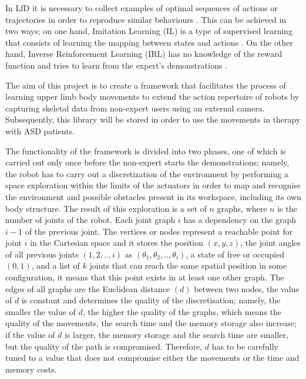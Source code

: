 \documentclass[thesis]{mas_proposal}
\begin{document}
    In LfD it is necessary to collect examples of optimal sequences of actions or trajectories in order to reproduce similar behaviours \cite{Piot2017}. This can be achieved in two ways; on one hand, Imitation Learning (IL) is a type of supervised learning that consists of learning the mapping between states and actions \cite{Dinyari2020}. On the other hand, Inverse Reinforcement Learning (IRL) has no knowledge of the reward function and tries to learn from the expert's demonstrations \cite{Reddy2019}.
    
    The aim of this project is to create a framework that facilitates the process of learning upper limb body movements to extend the action repertoire of robots by capturing skeletal data from non-expert users using an external camera. Subsequently, this library will be stored in order to use the movements in therapy with ASD patients.
    
    The functionality of the framework is divided into two phases, one of which is carried out only once before the non-expert starts the demonstrations; namely, the robot has to carry out a discretization of the environment by performing a space exploration within the limits of the actuators in order to map and recognise the environment and possible obstacles present in its workspace, including its own body structure. The result of this exploration is a set of $n$ graphs, where $n$ is the number of joints of the robot. Each joint graph $i$ has a dependency on the graph $i-1$ of the previous joint. The vertices or nodes represent a reachable point for joint $i$ in the Cartesian space and it stores the position $(x, y, z)$, the joint angles of all previous joints $(1,2,..,i)$ as $(\theta_1, \theta_2,..,\theta_i)$, a state of free or occupied $(0, 1)$, and a list of $k$ joints that can reach the same spatial position in some configuration, it means that this point exists in at least one other graph. 	
 	The edges of all graphs are the Euclidean distance $(d)$ between two nodes, the value of $d$ is constant and determines the quality of the discretisation; namely, the smaller the value of $d$, the higher the quality of the graphs, which means the quality of the movements, the search time and the memory storage also increase; if the value of $d$ is larger, the memory storage and the search time are smaller, but the quality of the path is compromised. Therefore, $d$ has to be carefully tuned to a value that does not compromise either the movements or the time and memory costs.
 	
\end{document}
